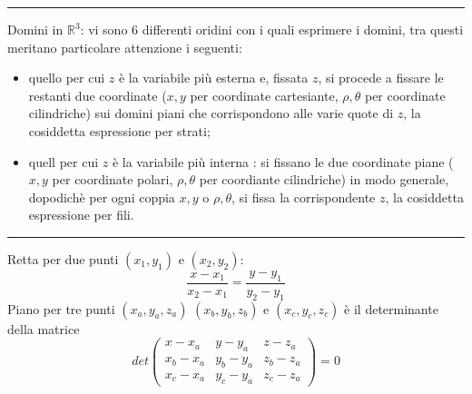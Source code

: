 \rule{\textwidth}{0,4pt}\newline
Domini in $\mathbb{R}^3$: vi sono 6 differenti oridini con i quali esprimere i domini, tra questi meritano particolare attenzione i seguenti:
\begin{itemize}
    \item quello per cui $z$ è la variabile più esterna e, fissata $z$, si procede a fissare le restanti due coordinate ($x,y$ per coordinate cartesiante, $\rho, \theta$ per coordinate cilindriche) sui domini piani che corrispondono alle varie quote di $z$, la cosiddetta espressione per strati;
    \item quell per cui $z$ è la variabile più interna : si fissano le due coordinate piane ($x,y$ per coordinate polari, $\rho, \theta$ per coordiante cilindriche) in modo generale, dopodichè per ogni coppia $x,y$ o $\rho, \theta$, si fissa la corrispondente $z$, la cosiddetta espressione per fili.
\end{itemize}
\rule{\textwidth}{0,4pt}\newline
Retta per due punti $(x_1, y_1)$ e $(x_2, y_2)$:
\[
    \frac{x - x_1}{x_2 - x_1} = \frac{y-y_1}{y_2 - y_1}
\]
Piano per tre punti $(x_a, y_a, z_a)$ $(x_b, y_b, z_b)$ e $(x_c, y_c, z_c)$ è il determinante della matrice 
\[
    det\left(\begin{matrix}
        x-x_a & y-y_a & z-z_a\\
        x_b-x_a & y_b-y_a & z_b-z_a\\
        x_c-x_a & y_c - y_a & z_c -z_a 
    \end{matrix}\right) = 0
\]
